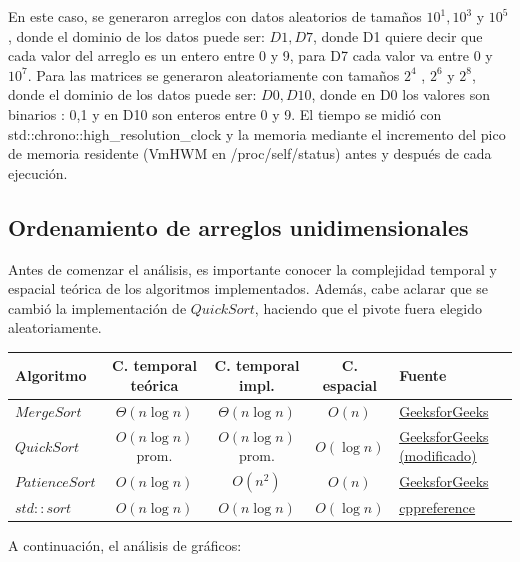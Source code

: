 
En este caso, se generaron arreglos con datos aleatorios de tamaños $10^{1} , 10^{3}$ y $10^{5}$, donde el dominio de los datos puede ser: ${D1,D7}$, donde D1 quiere decir que cada valor del arreglo es un entero entre 0 y 9, para D7 cada valor va entre 0 y $10^{7}$. Para las matrices se generaron aleatoriamente con tamaños $2^{4}$ , $2^{6}$ y $2^{8} $, donde el dominio de los datos puede ser: ${D0,D10}$, donde en D0 los valores son binarios : {0,1} y en D10 son enteros entre 0 y 9. El tiempo se
midió con std::chrono::high\_resolution\_clock y la memoria mediante el incremento del pico de memoria residente (VmHWM en /proc/self/status) antes y después de cada ejecución.



\subsection{Ordenamiento de arreglos unidimensionales}

Antes de comenzar el análisis, es importante conocer la complejidad temporal y espacial teórica de los algoritmos implementados. Además, cabe aclarar que se cambió la implementación de $QuickSort$, haciendo que el pivote fuera elegido aleatoriamente.

\begin{table}[!h]
\centering
\label{tab:complejidades_sort}
\begin{tabular}{|l|c|c|c|l|}
\hline
\textbf{Algoritmo} & \textbf{C. temporal teórica} & \textbf{C. temporal impl.} & \textbf{C. espacial} & \textbf{Fuente} \\ \hline
$MergeSort$ & $\Theta(n \log n)$ & $\Theta(n \log n)$ & $O(n)$ &
\href{https://www.geeksforgeeks.org/cpp/cpp-program-for-merge-sort/}{GeeksforGeeks} \\ \hline
$QuickSort$ & $O(n \log n)$ prom. & $O(n \log n)$ prom. & $O(\log n)$ &
\href{https://www.geeksforgeeks.org/cpp/cpp-program-for-quicksort/}{GeeksforGeeks (modificado)} \\ \hline
$PatienceSort$ & $O(n \log n)$ & $O(n^2)$ & $O(n)$ &
\href{https://www.geeksforgeeks.org/dsa/patience-sorting/}{GeeksforGeeks} \\ \hline
$std::sort$ & $O(n \log n)$ & $O(n \log n)$ & $O(\log n)$ &
\href{https://en.cppreference.com/w/cpp/algorithm/sort}{cppreference} \\ \hline
\end{tabular}
\end{table}

A continuación, el análisis de gráficos:

